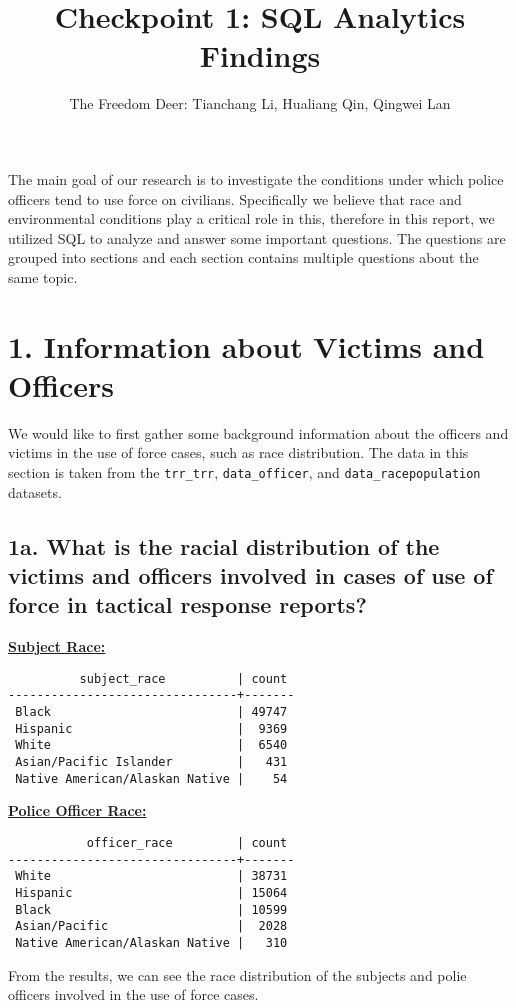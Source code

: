 \documentclass[10pt]{article}
\title{Checkpoint 1: SQL Analytics Findings}
\author{The Freedom Deer: Tianchang Li, Hualiang Qin, Qingwei Lan}
\begin{document}
\maketitle

The main goal of our research is to investigate the conditions under which police officers tend to use force on civilians. Specifically we believe that race and environmental conditions play a critical role in this, therefore in this report, we utilized SQL to analyze and answer some important questions. The questions are grouped into sections and each section contains multiple questions about the same topic.

\section*{1. Information about Victims and Officers}

We would like to first gather some background information about the officers and victims in the use of force cases, such as race distribution. The data in this section is taken from the \texttt{trr\_trr}, \texttt{data\_officer}, and \texttt{data\_racepopulation} datasets.

\subsection*{1a. What is the racial distribution of the victims and officers involved in cases of use of force in tactical response reports?}

\underline{\textbf{Subject Race:}}
\begin{verbatim}
          subject_race          | count
--------------------------------+-------
 Black                          | 49747
 Hispanic                       |  9369
 White                          |  6540
 Asian/Pacific Islander         |   431
 Native American/Alaskan Native |    54
\end{verbatim}


\underline{\textbf{Police Officer Race:}}
\begin{verbatim}
           officer_race         | count
--------------------------------+-------
 White                          | 38731
 Hispanic                       | 15064
 Black                          | 10599
 Asian/Pacific                  |  2028
 Native American/Alaskan Native |   310
\end{verbatim}

From the results, we can see the race distribution of the subjects and polie officers involved in the use of force cases.
\end{document}
